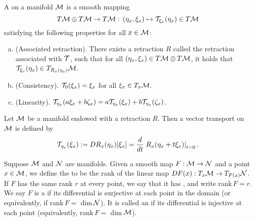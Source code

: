 \documentclass[11pt,a4paper]{article}
\begin{document}
\begin{mydef}\label{def:vector_transport}
A  on a manifold $\mathcal{M}$ is a smooth mapping
\begin{equation*}
T\mathcal{M}\oplus T\mathcal{M}\rightarrow T\mathcal{M} :\,(\eta_x,\xi_x)\mapsto \mathcal{T}_{\xi_x}(\eta_x)\in T\mathcal{M}
\end{equation*}
satisfying the following properties for all $x\in \mathcal{M}$:
\begin{enumerate}[(a)]
    \item (Associated retraction). There exists a retraction $R$ called the retraction associated with $\mathcal{T}$, such that for all $(\eta_x,\xi_x)\in T\mathcal{M}\oplus T\mathcal{M}$, it holds that $\mathcal{T}_{\xi_x}(\eta_x)\in T_{R_x(\eta_x)}\mathcal{M}$.
    \item (Consistency). $\mathcal{T}_0(\xi_x) = \xi_x$ for all $\xi_x\in T_x\mathcal{M}$.
    \item (Linearity). $\mathcal{T}_{\eta_x}(a\xi_x+b\zeta_x) = a\mathcal{T}_{\eta_x}(\xi_x)+b\mathcal{T}_{\eta_x}(\zeta_x)$.
\end{enumerate}
\end{mydef}

\begin{prop}\label{prop:vector_transport_diff_retraction}
Let $\mathcal{M}$ be a manifold endowed with a retraction $R$. Then a vector transport on $\mathcal{M}$ is defined by 
\begin{equation}
\mathcal{T}_{\eta_x}(\xi_x) := DR_x(\eta_x)[\xi_x] = \dfrac{d}{dt} \left.R_x(\eta_x+t\xi_x)\right|_{t=0}.
\end{equation}
\end{prop}

\begin{mydef}
Suppose $\mathcal{M}$ and $\mathcal{N}$ are manifolds. Given a smooth map $F:\mathcal{M}\rightarrow \mathcal{N}$ and a point $x\in \mathcal{M}$, we define the  to be the rank of the linear map $DF(x):T_x\mathcal{M}\rightarrow T_{F(x)}\mathcal{N}$. If $F$ has the same rank $r$ at every point, we say that it has , and write rank$\,F = r$. We say $F$ is a  if its differential is surjective at each point in the domain (or equivalently, if rank$\,F =$ dim$\,\mathcal{N}$). It is called an  if its differential is injective at each point (equivalently, rank$\,F = $ dim$\,\mathcal{M}$).
\end{mydef}
\end{document}
